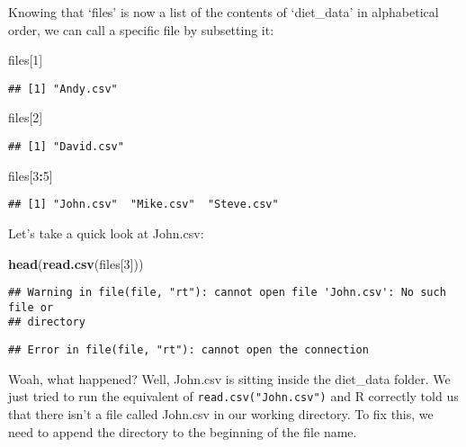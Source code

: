 \documentclass[
]{article}
\newenvironment{Shaded}{\begin{snugshade}}{\end{snugshade}}
\newcommand{\DecValTok}[1]{\textcolor[rgb]{0.00,0.00,0.81}{#1}}
\newcommand{\KeywordTok}[1]{\textcolor[rgb]{0.13,0.29,0.53}{\textbf{#1}}}
\newcommand{\NormalTok}[1]{#1}
\newcommand{\OperatorTok}[1]{\textcolor[rgb]{0.81,0.36,0.00}{\textbf{#1}}}
\begin{document}
Knowing that `files' is now a list of the contents of `diet\_data' in
alphabetical order, we can call a specific file by subsetting it:

\begin{Shaded}
\begin{Highlighting}[]
\NormalTok{files[}\DecValTok{1}\NormalTok{]}
\end{Highlighting}
\end{Shaded}

\begin{verbatim}
## [1] "Andy.csv"
\end{verbatim}

\begin{Shaded}
\begin{Highlighting}[]
\NormalTok{files[}\DecValTok{2}\NormalTok{]}
\end{Highlighting}
\end{Shaded}

\begin{verbatim}
## [1] "David.csv"
\end{verbatim}

\begin{Shaded}
\begin{Highlighting}[]
\NormalTok{files[}\DecValTok{3}\OperatorTok{:}\DecValTok{5}\NormalTok{]}
\end{Highlighting}
\end{Shaded}

\begin{verbatim}
## [1] "John.csv"  "Mike.csv"  "Steve.csv"
\end{verbatim}

Let's take a quick look at John.csv:

\begin{Shaded}
\begin{Highlighting}[]
\KeywordTok{head}\NormalTok{(}\KeywordTok{read.csv}\NormalTok{(files[}\DecValTok{3}\NormalTok{]))}
\end{Highlighting}
\end{Shaded}

\begin{verbatim}
## Warning in file(file, "rt"): cannot open file 'John.csv': No such file or
## directory
\end{verbatim}

\begin{verbatim}
## Error in file(file, "rt"): cannot open the connection
\end{verbatim}

Woah, what happened? Well, John.csv is sitting inside the diet\_data
folder. We just tried to run the equivalent of
\texttt{read.csv("John.csv")} and R correctly told us that there isn't a
file called John.csv in our working directory. To fix this, we need to
append the directory to the beginning of the file name.
\end{document}
